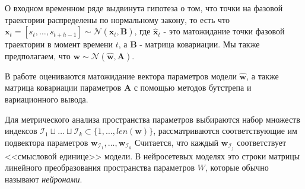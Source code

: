 \documentclass[12pt, twoside]{article}
\begin{document}
О входном временном ряде выдвинута гипотеза о том, что точки на фазовой траектории распределены по нормальному закону, то есть что $\mathbf{x}_t = [s_t, \dots, s_{t + h - 1}] \sim \mathcal{N}(\hat{\mathbf{x}}_t, \mathbf{B})$, где $\hat{\mathbf{x}}_t$ - это матожидание точки фазовой траектории в момент времени $t$, а $\mathbf{B}$ - матрица ковариации. Мы также предполагаем, что $\mathbf{w} \sim \mathcal{N}(\hat{\mathbf{w}}, \mathbf{A})$. 

В работе оцениваются матожидание вектора параметров модели $\hat{\mathbf{w}}$, а также матрица ковариации параметров $\mathbf{A}$ с помощью методов бутстрепа и вариационного вывода.

Для метрического анализа пространства параметров выбираются набор множеств индексов $\mathcal{I}_1 \sqcup \dots \sqcup \mathcal{I}_k \subset \{1, \dots, len(\mathbf{w})\}$, рассматриваются соответствующие им подвектора параметров $\mathbf{w}_{\mathcal{I}_1}, \dots, \mathbf{w}_{\mathcal{I}_k}$
Считается, что каждый $\mathbf{w}_{\mathcal{I}_j}$ соответствует <<смысловой единице>> модели. В нейросетевых моделях это строки матрицы линейного преобразования пространства параметров $W$, которые обычно называют \textit{нейронами}.



\end{document}
